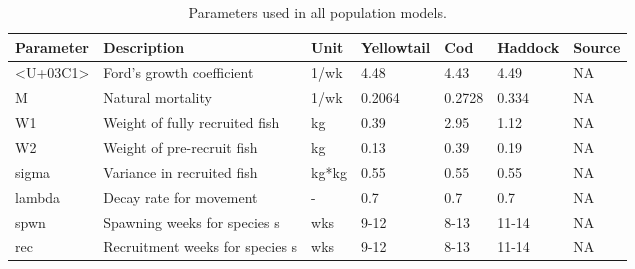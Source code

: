 \documentclass[
]{article}
\begin{document}
\begin{table}
 
 \caption{\label{tab:paramsALL2}Parameters used in all population models.}
 \centering
 \fontsize{10}{12}\selectfont
 \begin{tabular}[t]{lllllll}
 \toprule
 Parameter & Description & Unit & Yellowtail & Cod & Haddock & Source\\
 \midrule
 <U+03C1> & Ford's growth coefficient & 1/wk & 4.48 & 4.43 & 4.49 & NA\\
 M & Natural mortality & 1/wk & 0.2064 & 0.2728 & 0.334 & NA\\
 W1 & Weight of fully recruited fish & kg & 0.39 & 2.95 & 1.12 & NA\\
 W2 & Weight of pre-recruit fish & kg & 0.13 & 0.39 & 0.19 & NA\\
 sigma & Variance in recruited fish & kg*kg & 0.55 & 0.55 & 0.55 & NA\\
 \addlinespace
 lambda & Decay rate for movement & - & 0.7 & 0.7 & 0.7 & NA\\
 spwn & Spawning weeks for species s & wks & 9-12 & 8-13 & 11-14 & NA\\
 rec & Recruitment weeks for species s & wks & 9-12 & 8-13 & 11-14 & NA\\
 \bottomrule
 \end{tabular}
 \end{table}
\end{document}
